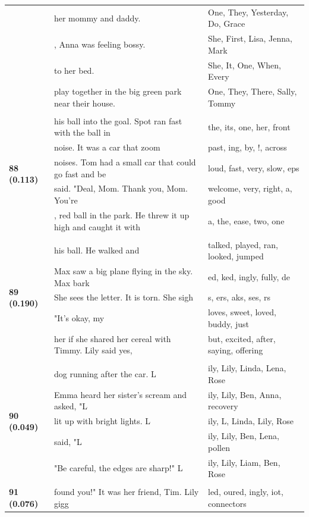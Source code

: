 \documentclass{article}
\theoremstyle{plain}
\theoremstyle{definition}
\theoremstyle{remark}
\begin{document}
\begin{longtable}{|p{}|p{}|p{}|}
& her mommy and daddy. & One,  They,  Yesterday,  Do,  Grace \\
& , Anna was feeling bossy. & She,  First,  Lisa,  Jenna,  Mark \\
& to her bed. & She,  It,  One,  When,  Every \\
& play together in the big green park near their house. & One,  They,  There,  Sally,  Tommy \\
& & \\
\multirow{5}{*}{\textbf{88 (0.113)}} & his ball into the goal.  Spot ran fast with the ball in & the,  its,  one,  her,  front \\
& noise. It was a car that zoom & past, ing,  by, !,  across \\
& noises. Tom had a small car that could go fast and be & loud,  fast,  very,  slow, eps \\
& said.  "Deal, Mom. Thank you, Mom. You're & welcome,  very,  right,  a,  good \\
& , red ball in the park. He threw it up high and caught it with & a,  the,  ease,  two,  one \\
& & \\
\multirow{5}{*}{\textbf{89 (0.190)}} & his ball. He walked and & talked,  played,  ran,  looked,  jumped \\
& Max saw a big plane flying in the sky.  Max bark & ed, ked, ingly, fully, de \\
& She sees the letter. It is torn. She sigh & s, ers, aks, ses, rs \\
& "It's okay, my & loves,  sweet,  loved,  buddy,  just \\
& her if she shared her cereal with Timmy. Lily said yes, & but,  excited,  after,  saying,  offering \\
& & \\
\multirow{5}{*}{\textbf{90 (0.049)}} & dog running after the car.   L & ily,  Lily,  Linda,  Lena,  Rose \\
& Emma heard her sister's scream and asked, "L & ily,  Lily,  Ben,  Anna,  recovery \\
& lit up with bright lights.   L & ily, L,  Linda,  Lily,  Rose \\
& said, "L & ily,  Lily,  Ben,  Lena,  pollen \\
& "Be careful, the edges are sharp!"   L & ily,  Lily,  Liam,  Ben,  Rose \\
& & \\
\multirow{5}{*}{\textbf{91 (0.076)}} & found you!" It was her friend, Tim.   Lily gigg & led, oured, ingly, iot,  connectors \\

\end{longtable}
\end{document}
